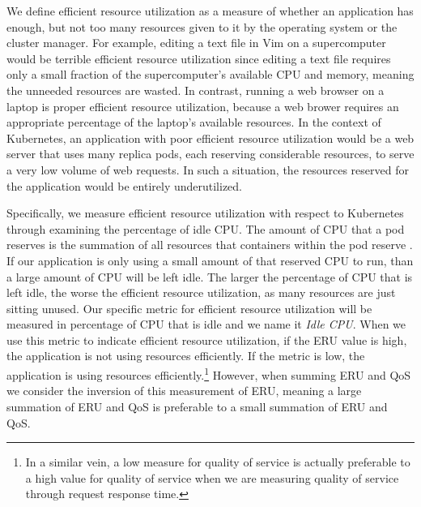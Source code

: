 We define efficient resource utilization as a measure of whether an application
has enough, but not too many resources given to it by the operating system or
the cluster manager. For example, editing a text file in Vim on a supercomputer
would be terrible efficient resource utilization since editing a text file
requires only a small fraction of the supercomputer's available CPU and memory,
meaning the unneeded resources are wasted. In contrast, running a web browser on
a laptop is proper efficient resource utilization, because a web brower requires
an appropriate percentage of the laptop's available resources.
In the context of Kubernetes, an application with
poor efficient resource utilization would be a web server
that uses many replica pods, each reserving considerable resources,
to serve a very low volume of web requests. In such a situation, the resources
reserved for the application would be entirely underutilized.

Specifically, we measure efficient resource utilization with respect to
Kubernetes through examining the percentage of idle CPU.
The amount of CPU that a pod reserves is the summation of
all resources that containers within the pod reserve
\cite{k8s-compute-resources}. If our application is only using a small amount of
that reserved CPU to run, than a large amount of CPU will be left idle. The
larger the percentage of CPU that is left idle, the worse the efficient resource
utilization, as many resources are just sitting unused.
Our specific metric for efficient resource
utilization will be measured in percentage of CPU that is idle and we name it
\textit{Idle CPU}. When we use this metric to indicate efficient resource utilization,
if the ERU value is high, the application is not using resources efficiently. If
the metric is low, the application is using resources efficiently.\footnote{In a
similar vein, a low measure for quality of service is actually preferable to a
high value for quality of service when we are measuring quality of service
through request response time.} However, when summing ERU and QoS we consider
the inversion of this measurement of ERU, meaning a large summation of ERU and
QoS is preferable to a small summation of ERU and QoS.

